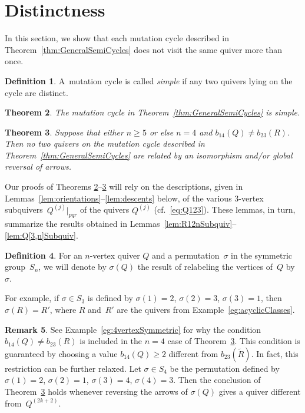 \documentclass[11pt, letterpaper]{amsart}
\newtheorem{theorem}{Theorem}[section]
\theoremstyle{definition}
\newtheorem{remark}[theorem]{Remark}
\newtheorem{definition}[theorem]{Definition}
\numberwithin{equation}{section}
\begin{document}
\newpage

\section{Distinctness}
\label{sec:distinctness}

In this section, we show that each mutation cycle described in Theorem~\ref{thm:GeneralSemiCycles} 
does not visit the same quiver more than once. 

\begin{definition}
\label{def:minimal-cycle}
A~mutation cycle is called \emph{simple} if any two quivers lying on the cycle are distinct. 
\end{definition}

\begin{theorem}
\label{thm:GeneralSemiCycleDistinct}
The mutation cycle in Theorem~\ref{thm:GeneralSemiCycles} is simple. 
\end{theorem}

\begin{theorem}
\label{thm:GeneralSemiCycleDistinct-noniso}
Suppose that either $n\ge 5$ or else $n=4$ and $b_{14}(Q) \neq b_{23}(R)$. 
Then no two quivers on the mutation cycle described in Theorem~\ref{thm:GeneralSemiCycles} 
are related by an isomorphism and/or global reversal of arrows.
\end{theorem}

Our proofs of Theorems \ref{thm:GeneralSemiCycleDistinct}--\ref{thm:GeneralSemiCycleDistinct-noniso} 
will rely on the descriptions, 
given in Lemmas~\ref{lem:orientations}--\ref{lem:descents} below, of 
the various 3-vertex subquivers~$Q^{(j)}|_{pqr}$ of the quivers $Q^{(j)}$ (cf.\ \eqref{eq:Q123}). 
These lemmas, in turn, summarize the results obtained in Lemmas~\ref{lem:R12nSubquiv}--\ref{lem:Q[3,n]Subquiv}. 

\begin{definition}
For an $n$-vertex quiver $Q$ and a permutation~$\sigma$ in the symmetric group~$S_n$, 
we will denote by $\sigma(Q)$ the result of relabeling the vertices of~$Q$ 
by~$\sigma$.  
\end{definition}

For example, if $\sigma\in S_3$ is defined by $\sigma(1)=2$, $\sigma(2)=3$, $\sigma(3)=1$,
then $\sigma(R)=R'$, where $R$ and~$R'$ are the quivers from Example~\ref{eg:acyclicClasses}.

\begin{remark}
See Example~\ref{eg:4vertexSymmetric} for why the condition $b_{14}(Q) \neq b_{23}(R)$ 
is included in the $n=4$ case of 
Theorem~\ref{thm:GeneralSemiCycleDistinct-noniso}.
This condition is guaranteed by 
choosing a value $b_{14}(Q)\ge 2$ different from $b_{23}(\tilde R)$. 
In fact, this restriction can be further relaxed. 
Let $\sigma \in S_4$ be the permutation defined by 
${\sigma(1) = 2}$, ${\sigma(2)=1}$, ${\sigma(3)=4}$, ${\sigma(4)=3}$.  
Then the conclusion of 
Theorem~\ref{thm:GeneralSemiCycleDistinct-noniso} holds whenever reversing the arrows of $\sigma(Q)$ gives a quiver different from~$Q^{(2k+2)}$. 
\end{remark}
\end{document}
